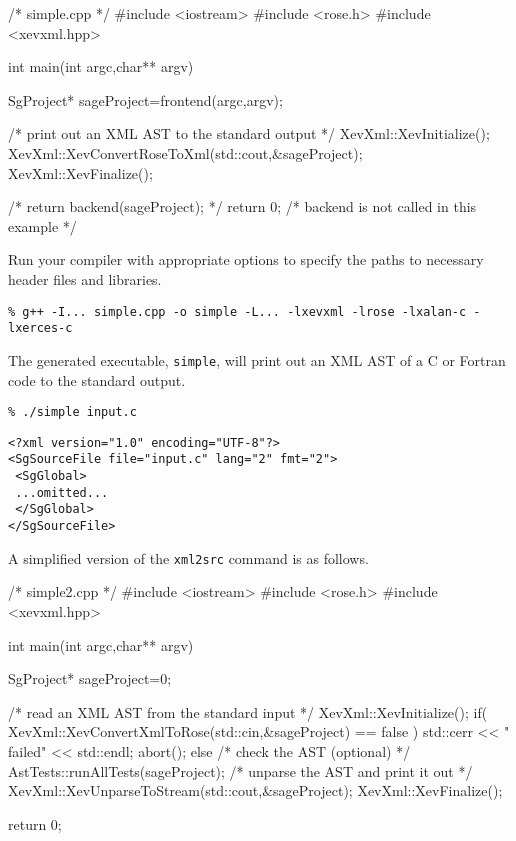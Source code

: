 \begin{framed}
\begin{src}
/* simple.cpp */
#include <iostream>
#include <rose.h>
#include <xevxml.hpp>

int main(int argc,char** argv){
  SgProject* sageProject=frontend(argc,argv);

  /* print out an XML AST to the standard output */
  XevXml::XevInitialize();
  XevXml::XevConvertRoseToXml(std::cout,&sageProject);
  XevXml::XevFinalize();

  /* return backend(sageProject); */
  return 0; /* backend is not called in this example */
}
\end{src}
\end{framed}

Run your compiler with appropriate options to specify the paths to
necessary header files and libraries.

\vspace{5mm}
\texttt{\% g++ -I... simple.cpp -o simple -L... -lxevxml -lrose -lxalan-c -lxerces-c }
\vspace{5mm}

\noindent The generated executable, \texttt{simple}, will print out an
XML AST of a C or Fortran code to the standard output.

\vspace{5mm}
\texttt{\% ./simple input.c}
\begin{verbatim}
<?xml version="1.0" encoding="UTF-8"?>
<SgSourceFile file="input.c" lang="2" fmt="2">
 <SgGlobal>
 ...omitted...
 </SgGlobal>
</SgSourceFile>
\end{verbatim}
\vspace{5mm}

A simplified version of the \texttt{xml2src} command is as follows.

\begin{framed}
\begin{src}
/* simple2.cpp */
#include <iostream>
#include <rose.h>
#include <xevxml.hpp>

int main(int argc,char** argv){
  SgProject* sageProject=0;

  /* read an XML AST from the standard input */
  XevXml::XevInitialize();
  if( XevXml::XevConvertXmlToRose(std::cin,&sageProject) == false ){
    std::cerr << " failed" << std::endl;
    abort();
  }
  else {
    /* check the AST (optional) */
    AstTests::runAllTests(sageProject);
    /* unparse the AST and print it out */
    XevXml::XevUnparseToStream(std::cout,&sageProject);
  }
  XevXml::XevFinalize();

  return 0;
}
\end{src}
\end{framed}

